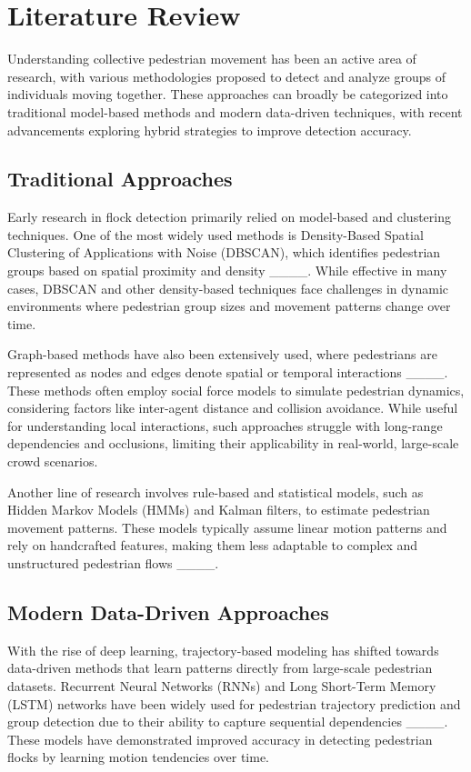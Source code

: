 \section{Literature Review}
Understanding collective pedestrian movement has been an active area of research, with various methodologies proposed to detect and analyze groups of individuals moving together. These approaches can broadly be categorized into traditional model-based methods and modern data-driven techniques, with recent advancements exploring hybrid strategies to improve detection accuracy.

\subsection{Traditional Approaches}

Early research in flock detection primarily relied on model-based and clustering techniques. One of the most widely used methods is Density-Based Spatial Clustering of Applications with Noise (DBSCAN), which identifies pedestrian groups based on spatial proximity and density ____. While effective in many cases, DBSCAN and other density-based techniques face challenges in dynamic environments where pedestrian group sizes and movement patterns change over time.

Graph-based methods have also been extensively used, where pedestrians are represented as nodes and edges denote spatial or temporal interactions ____. These methods often employ social force models to simulate pedestrian dynamics, considering factors like inter-agent distance and collision avoidance. While useful for understanding local interactions, such approaches struggle with long-range dependencies and occlusions, limiting their applicability in real-world, large-scale crowd scenarios.

Another line of research involves rule-based and statistical models, such as Hidden Markov Models (HMMs) and Kalman filters, to estimate pedestrian movement patterns. These models typically assume linear motion patterns and rely on handcrafted features, making them less adaptable to complex and unstructured pedestrian flows ____. 

\subsection{Modern Data-Driven Approaches}

With the rise of deep learning, trajectory-based modeling has shifted towards data-driven methods that learn patterns directly from large-scale pedestrian datasets. Recurrent Neural Networks (RNNs) and Long Short-Term Memory (LSTM) networks have been widely used for pedestrian trajectory prediction and group detection due to their ability to capture sequential dependencies ____. These models have demonstrated improved accuracy in detecting pedestrian flocks by learning motion tendencies over time.

